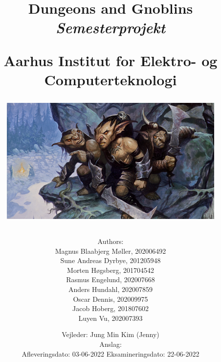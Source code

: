 \newcommand{\authorName}{}
\newcommand{\titleName}{Dungeons and Gnoblins}
\newcommand{\subject}{Semesterprojekt}
\newcommand{\vejleder}{Vejleder: Jung Min Kim (Jenny)}
\newcommand{\institute}{Aarhus Institut for Elektro- og Computerteknologi}
\begin{titlepage}
  \centering
    \title
    {
      \Huge \textbf{\titleName}\\
      \scale{\numberSQRTTWO}{\vspace{\sol pt}}
      \LARGE \textit{\subject}
      \scale{\numberSQRTTWO}{\rule{\linewidth}{\sol pt}}

      \textbf{\institute}

      \begin{figure}[h]
        \centering
        \includegraphics[scale=0.3]{02-Body/Images/FrontImage.png}
      \end{figure}

      \author
    {
      \LARGE Authors: \\
      Magnus Blaabjerg Møller, 202006492 \\
      Sune Andreas Dyrbye, 201205948 \\
      Morten Høgsberg, 201704542 \\
      Rasmus Engelund, 202007668 \\
      Anders Hundahl, 202007859 \\
      Oscar Dennis, 202009975 \\
      Jacob Hoberg, 201807602 \\
      Luyen Vu, 202007393 \\
      }
           \date{
        \Large \vejleder \\
        \vspace{2em}
        Anslag: \\
        \vspace{2em}
        Afleveringsdato: 03-06-2022 \hfill
        Eksamineringsdato: 22-06-2022\\
      }


    }
   
\end{titlepage}
